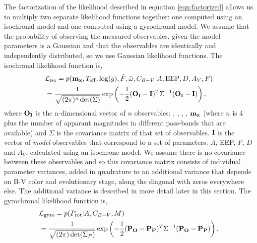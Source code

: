 The factorization of the likelihood described in equation \ref{eqn:factorized}
allows us to multiply two separate likelihood functions together: one computed
using an isochronal model and one computed using a gyrochronal model.
We assume that the probability of observing the measured observables, given
the model parameters is a Gaussian and that the observables are identically
and independently distributed, so we use Gaussian likelihood functions.
The isochronal likelihood function is,
\begin{eqnarray} \label{eqn:isochrones_only_likelihood}
    & \mathcal{L_{\mathrm{iso}}} = p({\bf m_x}, T_{\mathrm{eff}}, \log(g),
    \hat{F},
    \bar{\omega}, C_{B-V}|A, \mathrm{EEP}, D,
    A_V, F) \\ \nonumber
    & = \frac{1}{\sqrt{(2\pi)^n \det(\Sigma)}}
    \exp\left( -\frac{1}{2} ({\bf O_I} - {\bf I})^T \Sigma ^{-1}
    ({\bf O_I} - {\bf I})\right),
\end{eqnarray}
where ${\bf O_I}$ is the n-dimensional vector of $n$ observables: \teff,
\logg, \fhat, \pmega, ${\bf m_x}$ (where $n$ is 4 plus the number of
apparant magnitudes in different pass-bands that are available) and $\Sigma$
is the covariance matrix of that set of observables.
${\bf I}$ is the vector of {\it model} observables that correspond to a set of
parameters: $A$, EEP, $F$, $D$ and $A_V$, calculated using an isochrone model.
We assume there is no covariance between these observables and so this
covariance matrix consists of individual parameter variances, added in
quadrature to an additional variance that depends on B-V color and
evolutionary stage, along the diagonal with zeros everywhere else.
The additional variance is described in more detail later in this section.
The gyrochronal likelihood function is,
\begin{eqnarray} \label{eqn:gyro_likelihood}
    & \mathcal{L_{\mathrm{gyro}}} = p(P_\mathrm{rot} |A, C_{B-V}, M) \\ \nonumber
    & = \frac{1}{\sqrt{(2\pi) \det(\Sigma_P)}}
    \exp\left( -\frac{1}{2} ({\bf P_O} - {\bf P_P})^T \Sigma ^{-1}
    ({\bf P_O} - {\bf P_P})\right),
\end{eqnarray}
